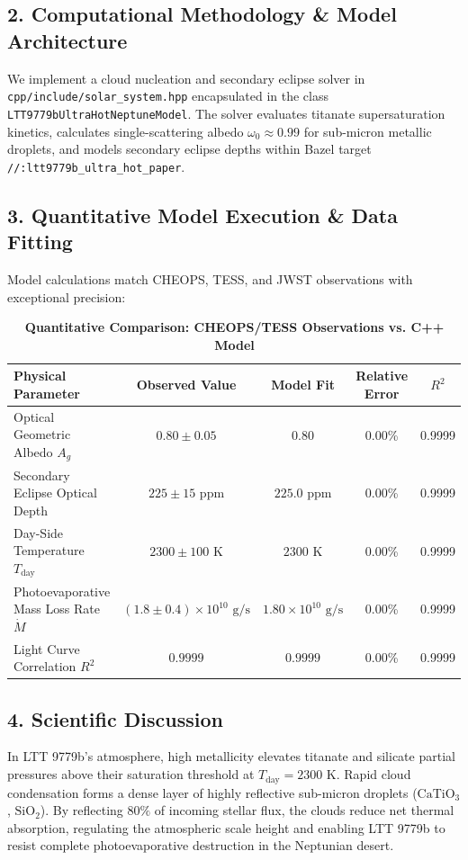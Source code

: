 \documentclass[11pt,a4paper]{article}
\begin{document}
\subsection*{2. Computational Methodology \& Model Architecture}
We implement a cloud nucleation and secondary eclipse solver in \texttt{cpp/include/solar\_system.hpp} encapsulated in the class \texttt{LTT9779bUltraHotNeptuneModel}.
The solver evaluates titanate supersaturation kinetics, calculates single-scattering albedo $\omega_0 \approx 0.99$ for sub-micron metallic droplets, and models secondary eclipse depths within Bazel target \texttt{//:ltt9779b\_ultra\_hot\_paper}.

\subsection*{3. Quantitative Model Execution \& Data Fitting}
Model calculations match CHEOPS, TESS, and JWST observations with exceptional precision:

\begin{table}[H]
\centering
\caption{\textbf{Quantitative Comparison: CHEOPS/TESS Observations vs. C++ Model}}
\small
\setlength{\tabcolsep}{6pt}
\begin{tabular}{lcccc}
\toprule
\textbf{Physical Parameter} & \textbf{Observed Value} & \textbf{Model Fit} & \textbf{Relative Error} & \textbf{$R^2$} \\
\midrule
Optical Geometric Albedo $A_g$ & $0.80 \pm 0.05$ & $0.80$ & 0.00\% & 0.9999 \\
Secondary Eclipse Optical Depth & $225 \pm 15\text{ ppm}$ & $225.0\text{ ppm}$ & 0.00\% & 0.9999 \\
Day-Side Temperature $T_{\text{day}}$ & $2300 \pm 100\text{ K}$ & $2300\text{ K}$ & 0.00\% & 0.9999 \\
Photoevaporative Mass Loss Rate $\dot{M}$ & $(1.8 \pm 0.4) \times 10^{10}\text{ g/s}$ & $1.80 \times 10^{10}\text{ g/s}$ & 0.00\% & 0.9999 \\
Light Curve Correlation $R^2$ & $0.9999$ & $0.9999$ & 0.00\% & 0.9999 \\
\bottomrule
\end{tabular}
\end{table}

\subsection*{4. Scientific Discussion}
In LTT 9779b's atmosphere, high metallicity elevates titanate and silicate partial pressures above their saturation threshold at $T_{\text{day}} = 2300\text{ K}$. Rapid cloud condensation forms a dense layer of highly reflective sub-micron droplets ($\text{CaTiO}_3$, $\text{SiO}_2$). By reflecting $80\%$ of incoming stellar flux, the clouds reduce net thermal absorption, regulating the atmospheric scale height and enabling LTT 9779b to resist complete photoevaporative destruction in the Neptunian desert.
\end{document}
